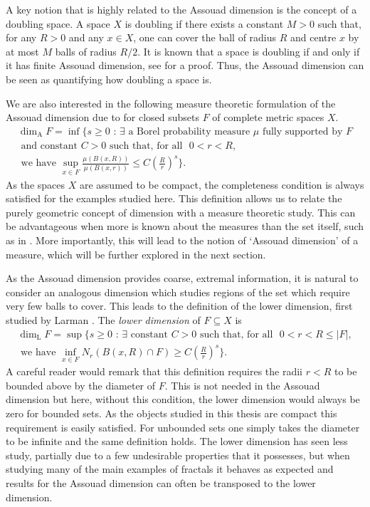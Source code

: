 A key notion that is highly related to the Assouad dimension is the concept of a doubling space. A space $X$ is doubling if there exists a constant $M > 0$ such that, for any $R > 0$ and any $x \in X$, one can cover the ball of radius $R$ and centre $x$ by at most $M$ balls of radius $R/2$. It is known that a space is doubling if and only if it has finite Assouad dimension, see \cite[Lemma 9.4]{robinson} for a proof. Thus, the Assouad dimension can be seen as quantifying how doubling a space is.

We are also interested in the following measure theoretic formulation of the Assouad dimension due to \cite{luksak, konyagin} for closed subsets $F$ of complete metric spaces $X$. 
\begin{align*}
   \dim_{\text{A}} F = \inf \Bigg\{ s \geq 0 \, \,  : \, \exists \text{ a Borel probability measure } \mu \text{ fully supported by }F \\  
   \text{ and constant }C > 0\text{  such that, } \text{for all } \, \, 0< r< R, \\ 
   \text{ we have  }  \sup_{x\in F} \frac{\mu(B(x,R))}{\mu(B(x,r))} \leq C\left(\frac{R}{r}\right)^{s} \Bigg\}. 
\end{align*}
As the spaces $X$ are assumed to be compact, the completeness condition is always satisfied for the examples studied here. This definition allows us to relate the purely geometric concept of dimension with a measure theoretic study. This can be advantageous when more is known about the measures than the set itself, such as in \cite{fraser-howroyd1}. More importantly, this will lead to the notion of `Assouad dimension' of a measure, which will be further explored in the next section. 


As the Assouad dimension provides coarse, extremal information, it is natural to consider an analogous dimension which studies regions of the set which require very few balls to cover. This leads to the definition of the lower dimension, first studied by Larman \cite{larman1,larman2}. The \textit{lower dimension} of $F \subseteq X$ is 
\begin{multline*}
\dim_{\text{L}} F = \sup \Bigg\{ s \geq 0 \, \,  : \, \exists \text{ constant }C > 0 \text{ such that, for all } \, \, 0< r< R \leq \lvert F \rvert,\\ \text{ we have  }\inf_{x\in F} N_r (B(x,R)\cap F) \geq C\left(\frac{R}{r}\right)^{s} \Bigg\}.
\end{multline*}
A careful reader would remark that this definition requires the radii $r< R$ to be bounded above by the diameter of $F$. This is not needed in the Assouad dimension but here, without this condition, the lower dimension would always be zero for bounded sets. As the objects studied in this thesis are compact this requirement is easily satisfied. For unbounded sets one simply takes the diameter to be infinite and the same definition holds. The lower dimension has seen less study, partially due to a few undesirable properties that it possesses, but when studying many of the main examples of fractals it behaves as expected and results for the Assouad dimension can often be transposed to the lower dimension. 

